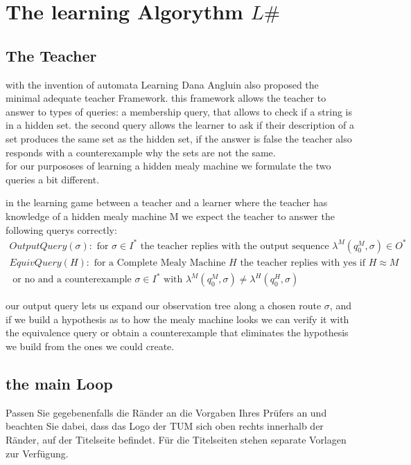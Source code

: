 \section{The learning Algorythm $L\#$}
\subsection{The Teacher}
with the invention of automata Learning Dana Angluin also proposed the minimal adequate teacher Framework. this framework allows the teacher to answer to types of queries: a membership query, that allows to check if a string is in a hidden set. the second query allows the learner to ask if their description of a set produces the same set as the hidden set, if the answer is false the teacher also responds with a counterexample why the sets are not the same.\cite[]{}\\
for our purpososes of learning a hidden mealy machine we formulate the two queries a bit different.
\begin{definition}
	in the learning game between a teacher and a learner where the teacher has knowledge of a hidden mealy machine M we expect the teacher to answer the following querys correctly:
	\begin{gather*}OutputQuery(\sigma): \text{ for }\sigma\in I^*\text{ the teacher replies with the output sequence } \lambda^M(q_0^M,\sigma)\in O^*\\
	EquivQuery(H):\text{ for a Complete Mealy Machine } H \text{ the teacher replies with yes if }H\approx M\\\text{ or no and a counterexample } \sigma\in I^*\text{ with }\lambda^M(q_0^M,\sigma)\neq\lambda^H(q_0^H,\sigma)
	\end{gather*}
\end{definition}
our output query lets us expand our observation tree along a chosen route $\sigma$, and if we build a hypothesis as to how the mealy machine looks we can verify it with the equivalence query or obtain a counterexample that eliminates the hypothesis we build from the ones we could create.
\subsection{the main Loop}
\clearpage

Passen Sie gegebenenfalls die Ränder an die Vorgaben Ihres Prüfers an und
beachten Sie dabei, dass das Logo der TUM sich oben rechts innerhalb der
Ränder, auf der Titelseite befindet. Für die Titelseiten stehen separate
Vorlagen zur Verfügung.

